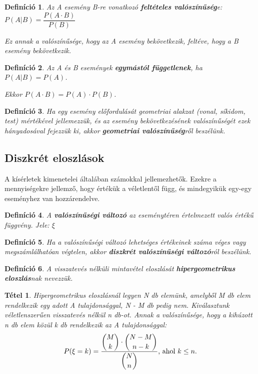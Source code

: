 \documentclass[12pt,a4paper]{article}
\newtheorem{theorem}{Tétel} [section]
\newtheorem{definition}{Definíció} [section]
\begin{document}
\begin{definition}
Az A esemény B-re vonatkozó \textbf{feltételes valószínűség}e: $P(A|B)=\dfrac{P(A\cdot B)}{P(B)}$

Ez annak a valószínűsége, hogy az A esemény bekövetkezik, feltéve, hogy a B esemény bekövetkezik.
\end{definition}

\begin{definition}
Az A és B események \textbf{egymástól függetlenek}, ha $P(A|B)=P(A)$.

Ekkor $P(A\cdot B)=P(A)\cdot P(B)$.
\end{definition}

\begin{definition}
Ha egy esemény előfordulását geometriai alakzat (vonal, síkidom, test) mértékével jellemezzük, és az esemény bekövetkezésének valószínűségét ezek hányadosával fejezzük ki, akkor \textbf{geometriai valószínűség}ről beszélünk.
\end{definition}
\subsection{Diszkrét eloszlások}
A kísérletek kimenetelei általában számokkal jellemezhetők. Ezekre a mennyiségekre jellemző, hogy értékük a véletlentől függ, és mindegyikük egy-egy eseményhez van hozzárendelve.

\begin{definition}
A \textbf{valószínűségi változó} az eseménytéren értelmezett valós értékű függvény. Jele: $\xi$
\end{definition}

\begin{definition}
Ha a valószínűségi változó lehetséges értékeinek száma véges vagy megszámlálhatóan végtelen, akkor \textbf{diszkrét valószínűségi változó}ról beszélünk.
\end{definition}

\begin{definition}
A visszatevés nélküli mintavétel eloszlását \textbf{hipergeometrikus eloszlás}nak nevezzük.
\end{definition}
\begin{theorem}
Hipergeometrikus eloszlásnál legyen N db elemünk, amelyből M db elem rendelkezik egy adott A tulajdonsággal, N - M db pedig nem. Kiválasztunk véletlenszerűen visszatevés nélkül n db-ot. Annak a valószínűsége, hogy a kihúzott n db elem közül k db rendelkezik az A tulajdonsággal:
\[P(\xi =k)=\dfrac{\displaystyle\binom{M}{k}\cdot \displaystyle\binom{N-M}{n-k}}{\displaystyle\binom{N}{n}} \text{\normalfont , ahol } k\leq n.\]
\end{theorem}
\end{document}
